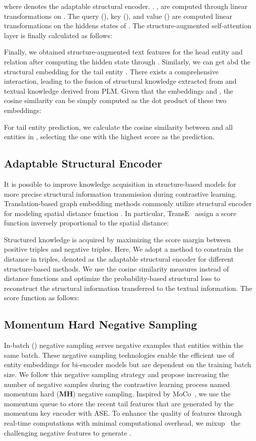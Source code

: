 \documentclass[11pt]{article}
\begin{document}
where  denotes the adaptable structural encoder. . ,  are computed through linear transformations on . 
The query (), key (), and value () are computed linear transformations on the hiddens states of . The structure-augmented self-attention layer is finally calculated as follows:

Finally, we obtained structure-augmented text features  for the head entity  and relation  after computing the hidden state through . 
Similarly, we can get  abd the structural embedding  for the tail entity . There exists a comprehensive interaction, leading to the fusion of structural knowledge extracted from  and textual knowledge derived from PLM. Given that the embeddings  and , the cosine similarity can be simply computed as the dot product of these two embeddings:

For tail entity prediction, we calculate the cosine similarity between  and all entities in , selecting the one with the highest score as the prediction.

\subsection{Adaptable Structural Encoder}
It is possible to improve knowledge acquisition in structure-based models for more precise structural information transmission during contrastive learning. Translation-based graph embedding methods commonly utilize structural encoder  for modeling spatial distance function . In particular, TransE~\cite{bordes2013translating} assign a score function  inversely proportional to the spatial distance: 


Structured knowledge is acquired by maximizing the score margin between positive triples and negative triples. Here, We adopt a method to constrain the distance in triples, denoted as the adaptable structural encoder  for different structure-based methods. We use the cosine similarity measures instead of distance functions and optimize the probability-based structural loss to reconstruct the structural information transferred to the textual information. The score function as follows:

\subsection{Momentum Hard Negative Sampling}
In-batch () negative sampling \cite{Wang2022SimKGCSC} serves negative examples that entities within the same batch. These negative sampling technologies enable the efficient use of entity embeddings for bi-encoder models but are dependent on the training batch size. We follow this negative sampling strategy and propose increasing the number of negative samples during the contrastive learning process named momentum hard (\textbf{MH}) negative sampling. Inspired by MoCo~\cite{he2020momentum}, we use the momentum queue  to store the recent  tail features  that are generated by the momentum key encoder with ASE. To enhance the quality of features through real-time computations with minimal computational overhead, we mixup~\cite{Kalantidis2020HardNM} the challenging negative features to generate . 
\end{document}
